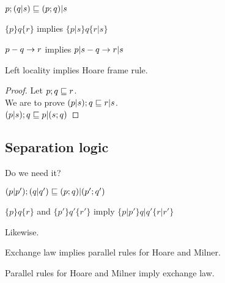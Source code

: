 \documentclass{article}
\begin{document}
\begin{law}
$p; (q | s) \sqsubseteq (p; q) | s$
\end{law}

\begin{rul}
$\{p\} q \{r\}$ implies $\{p | s\} q \{r | s\}$
\end{rul}

\begin{rul}
$p-q\rightarrow r$ implies $p | s-q\rightarrow r | s$
\end{rul}

\begin{theorem}
Left locality implies Hoare frame rule.
\end{theorem}

\begin{proof}
Let $p; q \sqsubseteq r$.\\
We are to prove $(p | s); q \sqsubseteq r | s$.\\
$(p | s); q \sqsubseteq p | (s ; q)$
\end{proof}

\subsection*{Separation logic}

\begin{axiom}
\end{axiom}

Do we need it?

\begin{law}[Exchange]
$(p|p');(q|q') \sqsubseteq (p;q)|(p';q')$
\end{law}

\begin{rul}
$\{p\}q\{r\}$ and $\{p'\}q'\{r'\}$ imply $\{p|p'\} q|q' \{r|r'\}$
\end{rul}

\begin{rul}
Likewise.
\end{rul}

\begin{theorem}
Exchange law implies parallel rules for Hoare and Milner.
\end{theorem}

\begin{theorem}
Parallel rules for Hoare and Milner imply exchange law.
\end{theorem}
\end{document}
